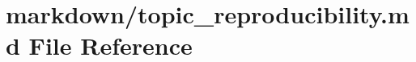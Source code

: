 \hypertarget{topic__reproducibility_8md}{}\section{markdown/topic\+\_\+reproducibility.md File Reference}
\label{topic__reproducibility_8md}
